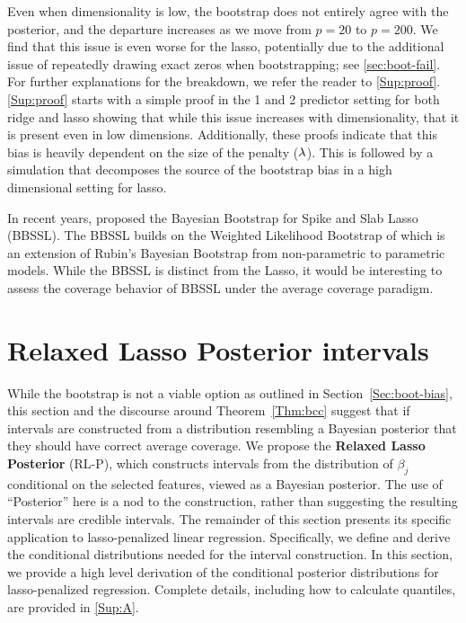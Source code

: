 Even when dimensionality is low, the bootstrap does not entirely agree with the posterior, and the departure increases as we move from $p=20$ to $p=200$. We find that this issue is even worse for the lasso, potentially due to the additional issue of repeatedly drawing exact zeros when bootstrapping; see \ref{sec:boot-fail}. For further explanations for the breakdown, we refer the reader to \ref{Sup:proof}. \ref{Sup:proof} starts with a simple proof in the 1 and 2 predictor setting for both ridge and lasso showing that while this issue increases with dimensionality, that it is present even in low dimensions. Additionally, these proofs indicate that this bias is heavily dependent on the size of the penalty ($\lambda$). This is followed by a simulation that decomposes the source of the bootstrap bias in a high dimensional setting for lasso.

In recent years, \cite{Nie2022} proposed the Bayesian Bootstrap for Spike and Slab Lasso (BBSSL). The BBSSL builds on the Weighted Likelihood Bootstrap of \cite{Newton1994} which is an extension of Rubin's Bayesian Bootstrap from non-parametric to parametric models. While the BBSSL is distinct from the Lasso, it would be interesting to assess the coverage behavior of BBSSL under the average coverage paradigm.

\section{Relaxed Lasso Posterior intervals}\label{Sec:methods}

While the bootstrap is not a viable option as outlined in Section~\ref{Sec:boot-bias}, this section and the discourse around Theorem~\ref{Thm:bcc} suggest that if intervals are constructed from a distribution resembling a Bayesian posterior that they should have correct average coverage. We propose the \textbf{Relaxed Lasso Posterior} (RL-P), which constructs intervals from the distribution of $\beta_j$ conditional on the selected features, viewed as a Bayesian posterior. The use of ``Posterior'' here is a nod to the construction, rather than suggesting the resulting intervals are credible intervals. The remainder of this section presents its specific application to lasso-penalized linear regression. Specifically, we define and derive the conditional distributions needed for the interval construction. In this section, we provide a high level derivation of the conditional posterior distributions for lasso-penalized regression. Complete details, including how to calculate quantiles, are provided in \ref{Sup:A}.

